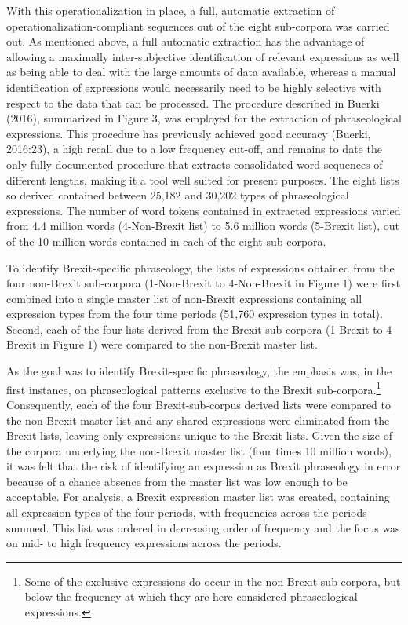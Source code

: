 \documentclass[12pt]{article}
\newenvironment{styleStandard}{\setlength\leftskip{0cm}\setlength\rightskip{0cm plus 1fil}\setlength\parindent{0cm}\setlength\parfillskip{0pt plus 1fil}\setlength\parskip{0in plus 1pt}\writerlistparindent\writerlistleftskip\leavevmode\normalfont\normalsize\writerlistlabel\ignorespaces}{\unskip\vspace{0.111in plus 0.0111in}\par}
\newcommand\writerlistleftskip{}
\newcommand\writerlistparindent{}
\newcommand\writerlistlabel{}
\begin{document}
\begin{styleStandard}
With this operationalization in place, a full, automatic extraction of operationalization-compliant sequences out of the eight sub-corpora was carried out. As mentioned above, a full automatic extraction has the advantage of allowing a maximally inter-subjective identification of relevant expressions as well as being able to deal with the large amounts of data available, whereas a manual identification of expressions would necessarily need to be highly selective with respect to the data that can be processed. The procedure described in Buerki (2016), summarized in Figure 3, was employed for the extraction of phraseological expressions. This procedure has previously achieved good accuracy (Buerki, 2016:23), a high recall due to a low frequency cut-off, and remains to date the only fully documented procedure that extracts consolidated word-sequences of different lengths, making it a tool well suited for present purposes. The eight lists so derived contained between 25,182 and 30,202 types of phraseological expressions. The number of word tokens contained in extracted expressions varied from 4.4 million words (4-Non-Brexit list) to 5.6 million words (5-Brexit list), out of the 10 million words contained in each of the eight sub-corpora.
\end{styleStandard}

\begin{styleStandard}
To identify Brexit-specific phraseology, the lists of expressions obtained from the four non-Brexit sub-corpora (1-Non-Brexit to 4-Non-Brexit in Figure 1) were first combined into a single master list of non-Brexit expressions containing all expression types from the four time periods (51,760 expression types in total). Second, each of the four lists derived from the Brexit sub-corpora (1-Brexit to 4-Brexit in Figure 1) were compared to the non-Brexit master list.
\end{styleStandard}

\begin{styleStandard}
As the goal was to identify Brexit-specific phraseology, the emphasis was, in the first instance, on phraseological patterns exclusive to the Brexit sub-corpora.\footnote{Some of the exclusive expressions do occur in the non-Brexit sub-corpora, but below the frequency at which they are here considered phraseological expressions.} Consequently, each of the four Brexit-sub-corpus derived lists were compared to the non-Brexit master list and any shared expressions were eliminated from the Brexit lists, leaving only expressions unique to the Brexit lists. Given the size of the corpora underlying the non-Brexit master list (four times 10 million words), it was felt that the risk of identifying an expression as Brexit phraseology in error because of a chance absence from the master list was low enough to be acceptable. For analysis, a Brexit expression master list was created, containing all expression types of the four periods, with frequencies across the periods summed. This list was ordered in decreasing order of frequency and the focus was on mid- to high frequency expressions across the periods.
\end{styleStandard}
\end{document}
